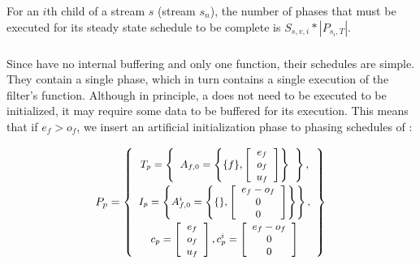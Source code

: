 For an $i$th child of a stream $s$ (stream $s_n$), the number of
phases that must be executed for its steady state schedule to be
complete is $S_{s,v,i} * |P_{s_i,T}|$.

\subsubsection{\filter}

Since {\filters} have no internal buffering and only one {\work}
function, their schedules are simple.  They contain a single
phase, which in turn contains a single execution of the filter's
{\work} function.  Although in principle, a {\filter} does not need to
be executed to be initialized, it may require some data to be
buffered for its execution.  This means that if $e_f > o_f$, we
insert an artificial initialization phase to phasing schedules of
{\filters}:

\begin{displaymath} \small
P_p = \left\{
\begin{array}{c}
T_p = \left\{
\begin{array}{c}
A_{f,0} = \left\{ \{f\}, \left[\begin{array}{c} e_f \\ o_f \\ u_f \end{array}\right]\right\} \\
\end{array}\right\}, \\
I_p = \left\{ A^i_{f,0} = \left\{ \{ \}, \left[\begin{array}{c}e_f - o_f \\ 0 \\ 0 \end{array}\right]\right\} \right\}, \\
c_p = \left[ \begin{array}{c} e_f \\ o_f \\ u_f \end{array}
\right], c^i_p = \left[ \begin{array}{c} e_f - o_f \\ 0 \\ 0
\end{array} \right]
\end{array}
\right\}
\end{displaymath}

\subsubsection{\pipeline}

